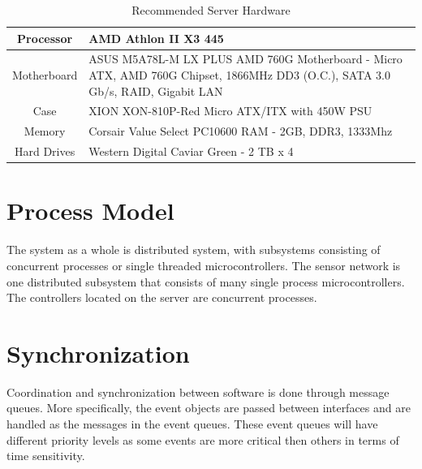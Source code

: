 \documentclass{report}
\begin{document}
\begin{table}[h]
    \caption{Recommended Server Hardware}
    \label{server_hardware}
    \centering
    \begin{tabular}{| c | p{5cm} |}
    \hline
    Processor & AMD Athlon II X3 445 \\ \hline
    Motherboard & ASUS M5A78L-M LX PLUS AMD 760G Motherboard - Micro ATX,
    AMD 760G Chipset, 1866MHz DD3 (O.C.), SATA 3.0 Gb/s, RAID, Gigabit LAN \\
    \hline
    Case &  XION XON-810P-Red Micro ATX/ITX with 450W PSU \\ \hline
    Memory & Corsair Value Select PC10600 RAM - 2GB, DDR3, 1333Mhz \\ \hline
    Hard Drives & Western Digital Caviar Green - 2 TB x 4 \\
    \hline
    \end{tabular}
\end{table}


\section{Process Model}

The system as a whole is distributed system, with subsystems consisting of
concurrent processes or single threaded microcontrollers. The sensor network is
one distributed subsystem that consists of many single process
microcontrollers. The controllers located on the server are concurrent
processes.


\section{Synchronization}

Coordination and synchronization between software is done through message
queues. More specifically, the event objects are passed between interfaces and
are handled as the messages in the event queues. These event queues will
have different priority levels as some events are more critical then others in
terms of time sensitivity. 
\end{document}
